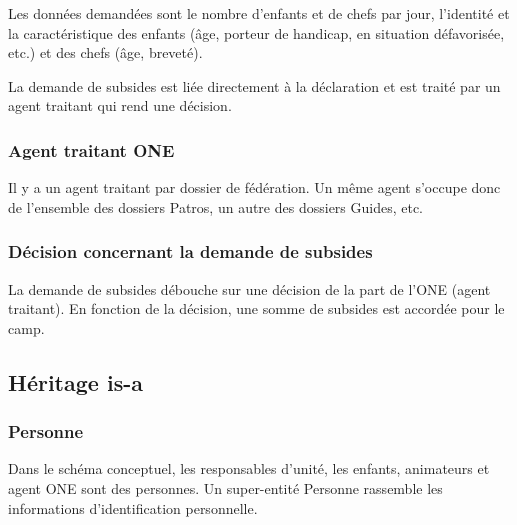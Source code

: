 Les données demandées sont le nombre d'enfants et de chefs par jour, l'identité et la caractéristique des enfants (âge, porteur de handicap, en situation défavorisée, etc.) et des chefs (âge, breveté). 

La demande de subsides est liée directement à la déclaration et est traité par un agent traitant qui rend une décision. 

\subsubsection{Agent traitant ONE}
Il y a un agent traitant par dossier de fédération. Un même agent s'occupe donc de l'ensemble des dossiers Patros, un autre des dossiers Guides, etc. 


\subsubsection{Décision concernant la demande de subsides}
La demande de subsides débouche sur une décision de la part de l'ONE (agent traitant). En fonction de la décision, une somme de subsides est accordée pour le camp.


\subsection{Héritage is-a}

\subsubsection{Personne}
Dans le schéma conceptuel, les responsables d'unité, les enfants, animateurs et agent ONE sont des personnes. Un super-entité Personne rassemble les informations d'identification personnelle. 
